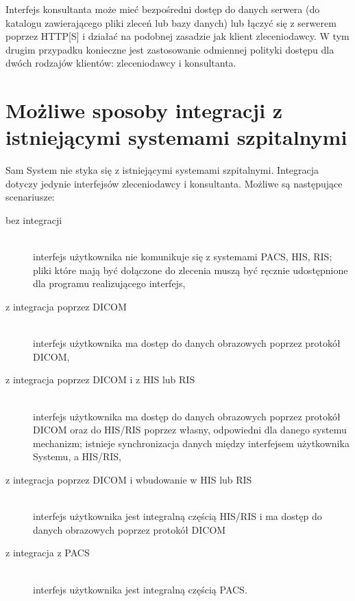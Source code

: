 \documentclass[a4paper]{article}
\begin{document}
Interfejs konsultanta może mieć bezpośredni dostęp do danych serwera (do katalogu
zawierającego pliki zleceń lub bazy danych) lub łączyć się z serwerem poprzez HTTP[S] i
działać na podobnej zasadzie jak klient zleceniodawcy. W tym drugim przypadku konieczne
jest zastosowanie odmiennej polityki dostępu dla dwóch rodzajów klientów: zleceniodawcy i
konsultanta. 

\section{Możliwe sposoby integracji z istniejącymi systemami szpitalnymi}

Sam System nie styka się z istniejącymi systemami szpitalnymi. Integracja dotyczy jedynie
interfejsów zleceniodawcy i konsultanta. Możliwe są następujące scenariusze:
\begin{description}
  \item[bez integracji]\hfill\\ interfejs użytkownika nie komunikuje się z systemami
  PACS, HIS, RIS; pliki które mają być dołączone do zlecenia muszą być ręcznie udostępnione dla
  programu realizującego interfejs,
  \item[z integracja poprzez DICOM]\hfill\\ interfejs użytkownika ma dostęp do danych
  obrazowych poprzez protokół DICOM,
  \item[z integracja poprzez DICOM i z HIS lub RIS]\hfill\\ interfejs użytkownika ma
  dostęp do danych obrazowych poprzez protokół DICOM oraz do HIS/RIS poprzez własny, odpowiedni dla danego
  systemu mechanizm; istnieje synchronizacja danych między interfejsem użytkownika Systemu,
  a HIS/RIS,
  \item[z integracja poprzez DICOM i wbudowanie w HIS lub RIS]\hfill\\ interfejs
  użytkownika jest integralną częścią HIS/RIS i ma dostęp do danych obrazowych poprzez protokół DICOM 
  \item[z integracja z PACS]\hfill\\ interfejs użytkownika jest integralną częścią PACS. 
\end{description}
\end{document}
